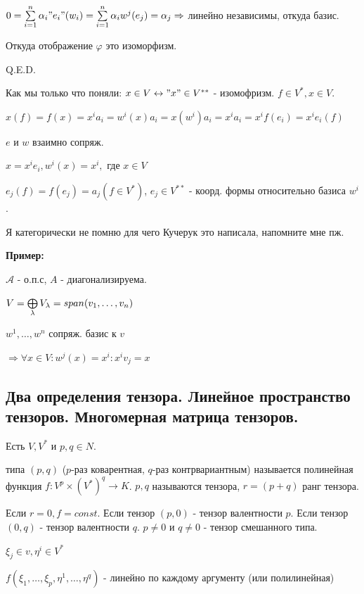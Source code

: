 $0= \sum\limits_{i=1}^n \alpha_i "e_i"(w_i)=\sum\limits_{i=1}^n\alpha_i w^j(e_j) = \alpha_j \Rightarrow$ линейно независимы, откуда базис.

Откуда отображение $\varphi$ это изоморфизм.

\hfill Q.E.D.

Как мы только что поняли: $x \in V \leftrightarrow "x" \in V^{**}$ - изомофризм. $f\in V^{*}, x \in V$.

$x(f)= f(x) = x^i a_i = w^i(x) a_i = x(w^i)a_i =x^ia_i=x^i f(e_i)=x^ie_i(f)$

$e \text{ и }w$ взаимно сопряж.

$x=x^ie_i, w^i(x)=x^i,$ где $x \in V$

$e_j(f)=f(e_j)=a_j(f \in V^*)$, $e_j \in V^{**}$ - коорд. формы относительно базиса $w^i$.

Я категорически не помню для чего Кучерук это написала, напомните мне пж.





\textbf{Пример:}

$\mathcal{A}$ - о.п.с, $A$ - диагонализируема.

$V = \bigoplus\limits_{\lambda}V_{\lambda} = span (v_1,\ldots,v_n)$

$w^1,\ldots,w^n$ сопряж. базис к $v$  %

$\Rightarrow \forall x \in V: w^j(x) =x^i: x^iv_j = x$ 

\newpage
\subsection{Два определения тензора. Линейное пространство тензоров. Многомерная матрица тензоров.}

 Есть $V,V^*$ и $p,q \in N$.

 типа $(p,q)$ ($p$-раз коварентная, $q$-раз контрвариантным) называется полинейная функция $f: V^p\times (V^*)^q \rightarrow K$. $p,q$ называются  тензора, $r = (p+q)$ ранг тензора.

Если $r = 0, f = const$. Если тензор $(p,0) $ -  тензор валентности $p$. Если тензор $(0,q)$ -  тензор валентности $q$. $p\neq 0 $ и $q\neq 0$ - тензор смешанного типа.

$\xi_j \in v, \eta^i \in V^*$

$f(\xi_1,\ldots,\xi_p,\eta^1,\ldots, \eta^q)$ - линейно по каждому аргументу (или полилинейная)

